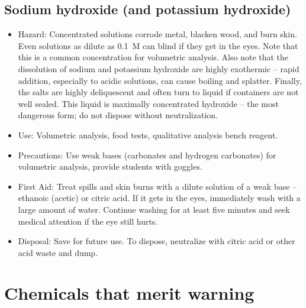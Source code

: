 \subsection{Sodium hydroxide (and potassium hydroxide)} 

\begin{itemize}

\item{Hazard: Concentrated solutions corrode metal, 
blacken wood, and burn skin. 
Even solutions as dilute as 0.1~M can blind if they get in the eyes. 
Note that this is a common concentration for volumetric analysis. 
Also note that the dissolution of sodium and potassium hydroxide 
are highly exothermic -- rapid addition, especially to acidic solutions, 
can cause boiling and splatter. 
Finally, the salts are highly deliquescent 
and often turn to liquid if containers are not well sealed. 
This liquid is maximally concentrated hydroxide -- 
the most dangerous form; do not dispose without neutralization.}

\item{Use: Volumetric analysis, food tests, 
qualitative analysis bench reagent.}

\item{Precautions: Use weak bases (carbonates and hydrogen carbonates) 
for volumetric analysis, provide students with goggles.}

\item{First Aid: Treat spills and skin burns 
with a dilute solution of a weak base -- ethanoic (acetic) or citric acid. 
If it gets in the eyes, immediately wash with a large amount of water. 
Continue washing for at least five minutes 
and seek medical attention if the eye still hurts.}

\item{Disposal: Save for future use. 
To dispose, neutralize with citric acid or other acid waste and dump.}

\end{itemize}

\section{Chemicals that merit warning}

